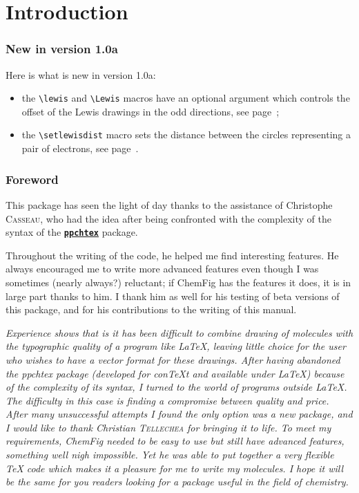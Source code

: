 \documentclass[10pt]{article}
\newcommand\CF{{\ECFAugie ChemFig}\xspace}
\begin{document}
\parindent0pt\pagestyle{plain}
\tableofcontents
\parskip\medskipamount
\vspace{2cm}

\part{Introduction}
\section{New in version 1.0a}
Here is what is new in version 1.0a:
\begin{itemize}
	\item the \verb-\lewis- and \verb-\Lewis- macros have an optional argument which controls the offset of the Lewis drawings in the odd directions, see page~\pageref{opt.lewis};
	\item the \verb-\setlewisdist- macro sets the distance between the circles representing a pair of electrons, see page~\pageref{setlewisdist}.
\end{itemize}

\section{Foreword}
This package has seen the light of day thanks to the assistance of Christophe \textsc{Casseau}, who had the idea after being confronted with the complexity of the syntax of the \href{http://www.ctan.org/tex-archive/help/Catalogue/entries/ppchtex.html}{\texttt{\textbf{ppchtex}}} package.

Throughout the writing of the code, he helped me find interesting features. He always encouraged me to write more advanced features even though I was sometimes (nearly always?) reluctant; if \CF has the features it does, it is in large part thanks to him. I thank him as well for his testing of beta versions of this package, and for his contributions to the writing of this manual.\medskip

\begingroup
{}\linewidth
{}\linewidth
\itshape\small
Experience shows that is it has been difficult to combine drawing of molecules with the typographic quality of a program like \LaTeX, leaving little choice for the user who wishes to have a vector format for these drawings. After having abandoned the \emph{ppchtex} package (developed for con\TeX t and available under \LaTeX) because of the complexity of its syntax, I turned to the world of programs outside \LaTeX. The difficulty in this case is finding a compromise between quality and price. After many unsuccessful attempts I found the only option was a new package, and I would like to thank Christian \textsc{Tellechea} for bringing it to life. To meet my requirements, \CF needed to be easy to use but still have advanced features, something well nigh impossible. Yet he was able to put together a very flexible \TeX{} code which makes it a pleasure for me to write my molecules. I hope it will be the same for you readers looking for a package useful in the field of chemistry.\smallskip
\end{document}
